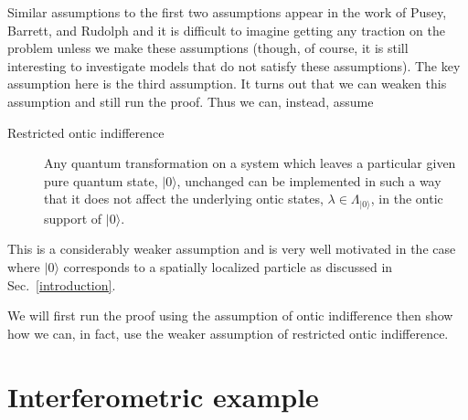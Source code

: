 \documentclass[12pt]{article}
\begin{document}
Similar assumptions to the first two assumptions appear in the work of Pusey, Barrett, and Rudolph and it is difficult to imagine getting any traction on the problem unless we make these
assumptions (though, of course, it is still interesting to investigate models that do not satisfy these assumptions).  The key assumption here is the third assumption.  It turns out that we can weaken this assumption and still run the proof.  Thus we can, instead, assume
\begin{description}
\item[Restricted ontic indifference] Any quantum transformation on a system which leaves a particular given pure quantum state, $|0\rangle$, unchanged can be implemented in such a way
    that it does not affect the underlying ontic states, $\lambda\in\Lambda_{|0\rangle}$, in the ontic support of $|0\rangle$.
\end{description}
This is a considerably weaker assumption and is very well motivated in the case where $|0\rangle$ corresponds to a spatially localized particle as discussed in Sec.\
\ref{introduction}.

We will first run the proof using the assumption of ontic indifference then show how we can, in fact, use the weaker assumption of restricted ontic indifference.




\section{Interferometric example} \label{interferometer}
\end{document}
